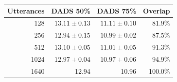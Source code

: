 \begin{tabular}{@{}rrrr@{}}
\toprule
Utterances & DADS 50\% & DADS 75\% & Overlap\\
\midrule
128 & $13.11\pm0.13$ & $11.11\pm0.10$ & 81.9\%\\
256 & $12.94\pm0.15$ & $10.99\pm0.02$ & 87.5\%\\
512 & $13.10\pm0.05$ & $11.01\pm0.05$ & 91.3\%\\
1024 & $12.97\pm0.04$ & $10.97\pm0.06$ & 94.9\%\\
1640 & 12.94 & 10.96 & 100.0\%\\
\bottomrule
\end{tabular}
